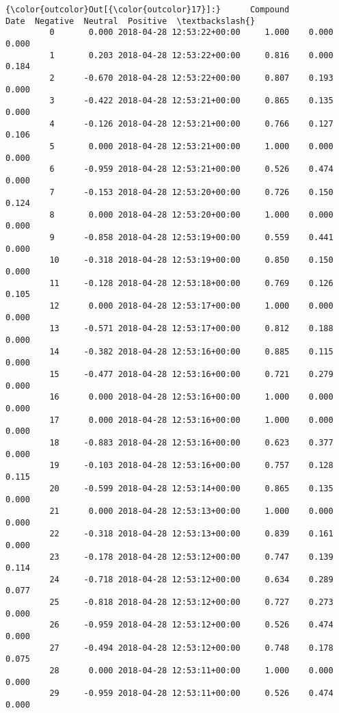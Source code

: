 \documentclass[11pt]{article}
\begin{document}
\begin{Verbatim}[commandchars=\\\{\}]
{\color{outcolor}Out[{\color{outcolor}17}]:}      Compound                      Date  Negative  Neutral  Positive  \textbackslash{}
         0       0.000 2018-04-28 12:53:22+00:00     1.000    0.000     0.000   
         1       0.203 2018-04-28 12:53:22+00:00     0.816    0.000     0.184   
         2      -0.670 2018-04-28 12:53:22+00:00     0.807    0.193     0.000   
         3      -0.422 2018-04-28 12:53:21+00:00     0.865    0.135     0.000   
         4      -0.126 2018-04-28 12:53:21+00:00     0.766    0.127     0.106   
         5       0.000 2018-04-28 12:53:21+00:00     1.000    0.000     0.000   
         6      -0.959 2018-04-28 12:53:21+00:00     0.526    0.474     0.000   
         7      -0.153 2018-04-28 12:53:20+00:00     0.726    0.150     0.124   
         8       0.000 2018-04-28 12:53:20+00:00     1.000    0.000     0.000   
         9      -0.858 2018-04-28 12:53:19+00:00     0.559    0.441     0.000   
         10     -0.318 2018-04-28 12:53:19+00:00     0.850    0.150     0.000   
         11     -0.128 2018-04-28 12:53:18+00:00     0.769    0.126     0.105   
         12      0.000 2018-04-28 12:53:17+00:00     1.000    0.000     0.000   
         13     -0.571 2018-04-28 12:53:17+00:00     0.812    0.188     0.000   
         14     -0.382 2018-04-28 12:53:16+00:00     0.885    0.115     0.000   
         15     -0.477 2018-04-28 12:53:16+00:00     0.721    0.279     0.000   
         16      0.000 2018-04-28 12:53:16+00:00     1.000    0.000     0.000   
         17      0.000 2018-04-28 12:53:16+00:00     1.000    0.000     0.000   
         18     -0.883 2018-04-28 12:53:16+00:00     0.623    0.377     0.000   
         19     -0.103 2018-04-28 12:53:16+00:00     0.757    0.128     0.115   
         20     -0.599 2018-04-28 12:53:14+00:00     0.865    0.135     0.000   
         21      0.000 2018-04-28 12:53:13+00:00     1.000    0.000     0.000   
         22     -0.318 2018-04-28 12:53:13+00:00     0.839    0.161     0.000   
         23     -0.178 2018-04-28 12:53:12+00:00     0.747    0.139     0.114   
         24     -0.718 2018-04-28 12:53:12+00:00     0.634    0.289     0.077   
         25     -0.818 2018-04-28 12:53:12+00:00     0.727    0.273     0.000   
         26     -0.959 2018-04-28 12:53:12+00:00     0.526    0.474     0.000   
         27     -0.494 2018-04-28 12:53:12+00:00     0.748    0.178     0.075   
         28      0.000 2018-04-28 12:53:11+00:00     1.000    0.000     0.000   
         29     -0.959 2018-04-28 12:53:11+00:00     0.526    0.474     0.000   

\end{Verbatim}
\end{document}
